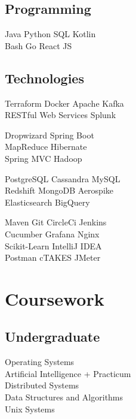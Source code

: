\documentclass[]{rajnikant-resume-openfont}
\begin{document}
\begin{minipage}[t]{0.33\textwidth}
\subsection{Programming}
Java \textbullet{}  Python \textbullet{} SQL \textbullet{} Kotlin \\ 
Bash \textbullet{} Go \textbullet{} React JS 
\sectionsep

\subsection{Technologies}
 Terraform   \textbullet{}  Docker \textbullet{}  Apache Kafka  \\
 RESTful Web Services \textbullet{} Splunk 
 \sectionsep
 
  Dropwizard \textbullet{} Spring Boot \\ 
 MapReduce  \textbullet{} Hibernate \\
 Spring MVC \textbullet{} Hadoop
\sectionsep

 PostgreSQL \textbullet{} Cassandra \textbullet{} MySQL \\
  Redshift \textbullet{} MongoDB \textbullet{} Aerospike \\
   Elasticsearch \textbullet{} BigQuery
 \sectionsep
 
 \sectionsep
 
  \sectionsep
 
      Maven  \textbullet{} Git \textbullet{} CircleCi \textbullet{} Jenkins \\
      Cucumber \textbullet{} Grafana \textbullet{} Nginx \\
       Scikit-Learn  \textbullet{} IntelliJ IDEA \\
      Postman \textbullet{} cTAKES \textbullet{} JMeter 
\sectionsep



\section{Coursework}
\subsection{Undergraduate}
Operating Systems \\
Artificial Intelligence + Practicum \\
Distributed Systems \\
Data Structures and Algorithms\\
Unix Systems 
\sectionsep



%
%

\end{minipage} 
\end{document}
